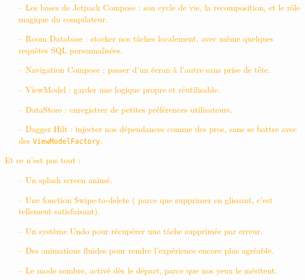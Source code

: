 \vspace{2em} %
\vspace{2em} %
\begin{tcolorbox}[colback=orange!5!white, colframe=orange!80!black, 
title=\textbf{Voici ce qui t’attend}, sharp corners, boxrule=0.6pt]

\begin{itemize}
    \item[\footnotesize \textcolor{orange}{{--}}] \footnotesize \textcolor{orange}{{Les bases de Jetpack Compose} : son cycle de vie, la recomposition, et le rôle magique du compilateur.}
    \item[\footnotesize \textcolor{orange}{{--}}] \footnotesize \textcolor{orange}{{Room Database} : stocker nos tâches localement, avec même quelques requêtes SQL personnalisées.}
    \item[\footnotesize \textcolor{orange}{{--}}] \footnotesize \textcolor{orange}{{Navigation Compose} : passer d’un écran à l’autre sans prise de tête.}
    \item[\footnotesize \textcolor{orange}{{--}}] \footnotesize \textcolor{orange}{{ViewModel} : garder une logique propre et réutilisable.}
    \item[\footnotesize \textcolor{orange}{{--}}] \footnotesize \textcolor{orange}{{DataStore} : enregistrer de petites préférences utilisateurs.}
    \item[\footnotesize \textcolor{orange}{{--}}] \footnotesize \textcolor{orange}{{Dagger Hilt} : injecter nos dépendances comme des pros, sans se battre avec des \texttt{ViewModelFactory}.}
\end{itemize}

\vspace{0.5em}
{\footnotesize \textcolor{orange}{Et ce n’est pas tout :}}

\begin{itemize}
     \item[\footnotesize \textcolor{orange}{{--}}]   \footnotesize \textcolor{orange}{{ Un splash screen animé}.}
     \item[\footnotesize \textcolor{orange}{{--}}]   \footnotesize \textcolor{orange}{{ Une fonction Swipe-to-delete} ( parce que supprimer en glissant, c’est tellement satisfaisant).}
     \item[\footnotesize \textcolor{orange}{{--}}]  \footnotesize \textcolor{orange}{{  Un système Undo} pour récupérer une tâche supprimée par erreur.}
     \item[\footnotesize \textcolor{orange}{{--}}]   \footnotesize \textcolor{orange}{{Des animations fluides} pour rendre l’expérience encore plus agréable.}
     \item[\footnotesize \textcolor{orange}{{--}}]   \footnotesize \textcolor{orange}{{Le mode sombre}, activé dès le départ, parce que nos yeux le méritent.}
\end{itemize}

\end{tcolorbox}

